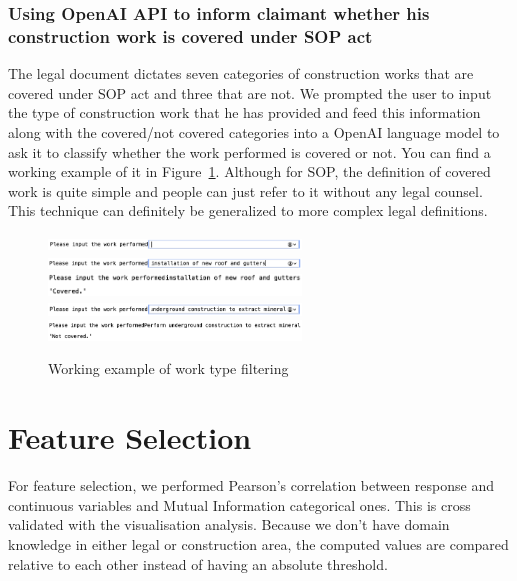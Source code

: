 \documentclass[12pt, b4paper]{article}
\begin{document}
      \subsubsection{Using OpenAI API to inform claimant whether his construction work is covered under SOP act}
      The legal document dictates seven categories of construction works that are covered under SOP act and three that are not. We prompted the user to input the type of construction work that he has provided and feed this information along with the covered/not covered categories into a OpenAI language model to ask it to classify whether the work performed is covered or not. You can find a working example of it in Figure~\ref{fig:OpenAI}. Although for SOP, the definition of covered work is quite simple and people can just refer to it without any legal counsel. This technique can definitely be generalized to more complex legal definitions.
      \begin{figure}
        \begin{center}
          \includegraphics[width=0.6\textwidth]{NLPimage/img1.png}
          \includegraphics[width=0.6\textwidth]{NLPimage/img2.png}
          \includegraphics[width=0.6\textwidth]{NLPimage/img3.png}
          \includegraphics[width=0.6\textwidth]{NLPimage/img4.png}
          \includegraphics[width=0.6\textwidth]{NLPimage/img5.png}
        \end{center}
        \caption{Working example of work type filtering}
        \label{fig:OpenAI}
      \end{figure}
      

  \section{Feature Selection}
  For feature selection, we performed Pearson's correlation between response and continuous variables and Mutual Information categorical ones. This is cross validated with the visualisation analysis. Because we don't have domain knowledge in either legal or construction area, the computed values are compared relative to each other instead of having an absolute threshold. 
\end{document}
